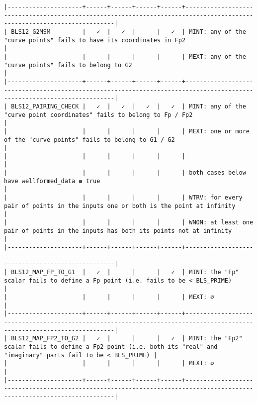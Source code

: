 \documentclass[varwidth=\maxdimen,margin=0.5cm,multi={verbatim}]{standalone}
\begin{document}
\begin{verbatim}
|---------------------+------+------+------+------+------------------------------------------------------------------------------------------------------------------------|
| BLS12_G2MSM         |   ✓  |   ✓  |      |   ✓  | MINT: any of the "curve points" fails to have its coordinates in Fp2                                                   |
|                     |      |      |      |      | MEXT: any of the "curve points" fails to belong to G2                                                                  |
|---------------------+------+------+------+------+------------------------------------------------------------------------------------------------------------------------|
| BLS12_PAIRING_CHECK |   ✓  |   ✓  |   ✓  |   ✓  | MINT: any of the "curve point coordinates" fails to belong to Fp / Fp2                                                 |
|                     |      |      |      |      | MEXT: one or more of the "curve points" fails to belong to G1 / G2                                                     |
|                     |      |      |      |      |                                                                                                                        |
|                     |      |      |      |      | both cases below have wellformed_data ≡ true                                                                           |
|                     |      |      |      |      | WTRV: for every pair of points in the inputs one or both is the point at infinity                                      |
|                     |      |      |      |      | WNON: at least one pair of points in the inputs has both its points not at infinity                                    |
|---------------------+------+------+------+------+------------------------------------------------------------------------------------------------------------------------|
| BLS12_MAP_FP_TO_G1  |   ✓  |      |      |   ✓  | MINT: the "Fp" scalar fails to define a Fp point (i.e. fails to be < BLS_PRIME)                                        |
|                     |      |      |      |      | MEXT: ∅                                                                                                                |
|---------------------+------+------+------+------+------------------------------------------------------------------------------------------------------------------------|
| BLS12_MAP_FP2_TO_G2 |   ✓  |      |      |   ✓  | MINT: the "Fp2" scalar fails to define a Fp2 point (i.e. both its "real" and "imaginary" parts fail to be < BLS_PRIME) |
|                     |      |      |      |      | MEXT: ∅                                                                                                                |
|---------------------+------+------+------+------+------------------------------------------------------------------------------------------------------------------------|


\end{verbatim}
\end{document}
